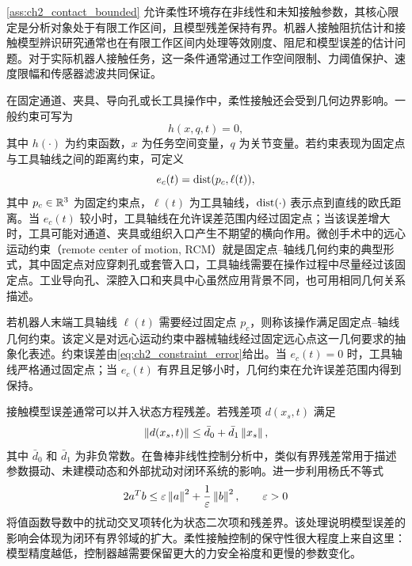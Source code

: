 \begin{remark}
\cref{ass:ch2_contact_bounded} 允许柔性环境存在非线性和未知接触参数，其核心限定是分析对象处于有限工作区间，且模型残差保持有界。机器人接触阻抗估计和接触模型辨识研究通常也在有限工作区间内处理等效刚度、阻尼和模型误差的估计问题\cite{diolaiti2005contact,haddadi2012huntcrossley}。对于实际机器人接触任务，这一条件通常通过工作空间限制、力阈值保护、速度限幅和传感器滤波共同保证。
\end{remark}

在固定通道、夹具、导向孔或长工具操作中，柔性接触还会受到几何边界影响。一般约束可写为
\begin{equation}
  h(x,q,t)=0,
  \label{eq:ch2_general_constraint}
\end{equation}
其中 $h(\cdot)$ 为约束函数，$x$ 为任务空间变量，$q$ 为关节变量。若约束表现为固定点与工具轴线之间的距离约束，可定义
\begin{equation}
  e_c(t)=\operatorname{dist}(p_c,\ell(t)),
  \label{eq:ch2_constraint_error}
\end{equation}
其中 $p_c\in\mathbb{R}^3$ 为固定约束点，$\ell(t)$ 为工具轴线，$\operatorname{dist}(\cdot)$ 表示点到直线的欧氏距离。当 $e_c(t)$ 较小时，工具轴线在允许误差范围内经过固定点；当该误差增大时，工具可能对通道、夹具或组织入口产生不期望的横向作用。微创手术中的远心运动约束（remote center of motion, RCM）就是固定点--轴线几何约束的典型形式，其中固定点对应穿刺孔或套管入口，工具轴线需要在操作过程中尽量经过该固定点\cite{aghakhani2013task,kastritsi2021rcmcontroller,zhang2024rcmreview}。工业导向孔、深腔入口和夹具中心虽然应用背景不同，也可用相同几何关系描述。

\begin{definition}
\label{def:ch2_point_axis_constraint}
若机器人末端工具轴线 $\ell(t)$ 需要经过固定点 $p_c$，则称该操作满足固定点--轴线几何约束。该定义是对远心运动约束中器械轴线经过固定远心点这一几何要求的抽象化表述\cite{aghakhani2013task,kastritsi2021rcmcontroller,kastritsi2022passiveadmittance}。约束误差由\eqref{eq:ch2_constraint_error}给出。当 $e_c(t)=0$ 时，工具轴线严格通过固定点；当 $e_c(t)$ 有界且足够小时，几何约束在允许误差范围内得到保持。
\end{definition}

接触模型误差通常可以并入状态方程残差。若残差项 $d(x_s,t)$ 满足
\begin{equation}
  \left\lVert d(x_s,t)\right\rVert\le \bar d_0+\bar d_1\left\lVert x_s\right\rVert,
  \label{eq:ch2_disturbance_bound}
\end{equation}
其中 $\bar d_0$ 和 $\bar d_1$ 为非负常数。在鲁棒非线性控制分析中，类似有界残差常用于描述参数摄动、未建模动态和外部扰动对闭环系统的影响\cite{khalil2002nonlinear}。进一步利用杨氏不等式
\begin{equation}
  2a^Tb\le \varepsilon\left\lVert a\right\rVert^2+\frac{1}{\varepsilon}\left\lVert b\right\rVert^2,\qquad \varepsilon>0
  \label{eq:ch2_young}
\end{equation}
将值函数导数中的扰动交叉项转化为状态二次项和残差界。该处理说明模型误差的影响会体现为闭环有界邻域的扩大。柔性接触控制的保守性很大程度上来自这里：模型精度越低，控制器越需要保留更大的力安全裕度和更慢的参数变化。

